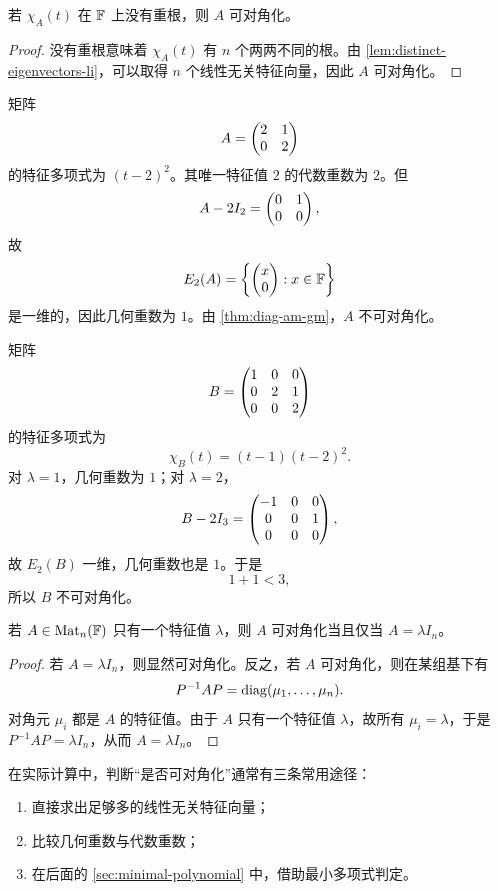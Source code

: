 \begin{corollary}
若 \(\chi_A(t)\) 在 \(\mathbb{F}\) 上没有重根，则 \(A\) 可对角化。
\end{corollary}

\begin{proof}
没有重根意味着 \(\chi_A(t)\) 有 \(n\) 个两两不同的根。由 \cref{lem:distinct-eigenvectors-li}，可以取得 \(n\) 个线性无关特征向量，因此 \(A\) 可对角化。
\end{proof}

\begin{example}
矩阵
\[
A=\begin{pmatrix} 2&1\\0&2 \end{pmatrix}
\]
的特征多项式为 \((t-2)^2\)。其唯一特征值 \(2\) 的代数重数为 \(2\)。但
\[
A-2I_2=\begin{pmatrix} 0&1\\0&0 \end{pmatrix},
\]
故
\[
E_2(A)=\left\{\begin{pmatrix} x\\0 \end{pmatrix}:x\in \mathbb{F}\right\}
\]
是一维的，因此几何重数为 \(1\)。由 \cref{thm:diag-am-gm}，\(A\) 不可对角化。
\end{example}

\begin{example}
矩阵
\[
B=\begin{pmatrix} 1&0&0\\0&2&1\\0&0&2 \end{pmatrix}
\]
的特征多项式为
\[
\chi_B(t)=(t-1)(t-2)^2.
\]
对 \(\lambda=1\)，几何重数为 \(1\)；对 \(\lambda=2\)，
\[
B-2I_3=\begin{pmatrix} -1&0&0\\0&0&1\\0&0&0 \end{pmatrix},
\]
故 \(E_2(B)\) 一维，几何重数也是 \(1\)。于是
\[
1+1<3,
\]
所以 \(B\) 不可对角化。
\end{example}

\begin{proposition}
若 \(A\in \mathrm{Mat}_n(\mathbb{F})\) 只有一个特征值 \(\lambda\)，则 \(A\) 可对角化当且仅当 \(A=\lambda I_n\)。
\end{proposition}

\begin{proof}
若 \(A=\lambda I_n\)，则显然可对角化。反之，若 \(A\) 可对角化，则在某组基下有
\[
P^{-1}AP=\mathrm{diag}(\mu_1,\dots,\mu_n).
\]
对角元 \(\mu_i\) 都是 \(A\) 的特征值。由于 \(A\) 只有一个特征值 \(\lambda\)，故所有 \(\mu_i=\lambda\)，于是 \(P^{-1}AP=\lambda I_n\)，从而 \(A=\lambda I_n\)。
\end{proof}

\begin{remark}
在实际计算中，判断“是否可对角化”通常有三条常用途径：
\begin{enumerate}[label=(\arabic*), leftmargin=2.4em]
  \item 直接求出足够多的线性无关特征向量；
  \item 比较几何重数与代数重数；
  \item 在后面的 \cref{sec:minimal-polynomial} 中，借助最小多项式判定。
\end{enumerate}
\end{remark}

